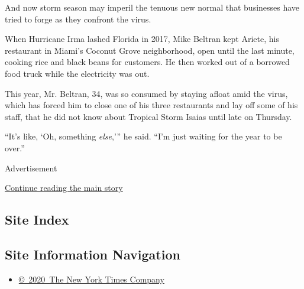 And now storm season may imperil the tenuous new normal that businesses
have tried to forge as they confront the virus.

When Hurricane Irma lashed Florida in 2017, Mike Beltran kept Ariete,
his restaurant in Miami's Coconut Grove neighborhood, open until the
last minute, cooking rice and black beans for customers. He then worked
out of a borrowed food truck while the electricity was out.

This year, Mr. Beltran, 34, was so consumed by staying afloat amid the
virus, which has forced him to close one of his three restaurants and
lay off some of his staff, that he did not know about Tropical Storm
Isaias until late on Thursday.

``It's like, `Oh, something \emph{else},''' he said. ``I'm just waiting
for the year to be over.''

Advertisement

\protect\hyperlink{after-bottom}{Continue reading the main story}

\hypertarget{site-index}{%
\subsection{Site Index}\label{site-index}}

\hypertarget{site-information-navigation}{%
\subsection{Site Information
Navigation}\label{site-information-navigation}}

\begin{itemize}
\tightlist
\item
  \href{https://help.nytimes3xbfgragh.onion/hc/en-us/articles/115014792127-Copyright-notice}{©~2020~The
  New York Times Company}
\end{itemize}

